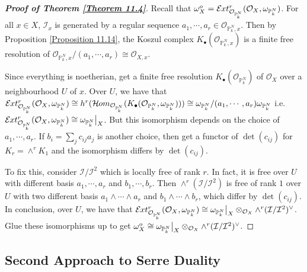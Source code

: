 \documentclass{ctexart}
\newcommand{\sheafhom}{\mathcal{H}\kern -.5pt om}
\newcommand{\sheafext}{\mathcal{E}\kern -.5pt xt}
\begin{document}
\begin{proof}[\textbf{\emph{Proof of Theorem \ref{Theorem 11.4}}}]
    Recall that $\omega_{X}^{o} = \sheafext_{\mathcal{O}_{\mathbb{P}_{k}^{N}}}^{r}(\mathcal{O}_{X}, \omega_{\mathbb{P}_{k}^{N}})$.
    For all $x\in X$, $\mathcal{I}_{x}$ is generated by a regular sequence $a_{1}, \cdots, a_{r}\in \mathcal{O}_{\mathbb{P}_{k}^{N}, x}$.
    Then by Proposition \ref{Proposition 11.14}, the Koszul complex $K_{\bullet}(\mathcal{O}_{\mathbb{P}_{k}^{N}, x})$ is a finite free resolution of $\mathcal{O}_{\mathbb{P}_{k}^{N}, x}/(a_{1}, \cdots, a_{r}) \cong \mathcal{O}_{X, x}$.
    \par
    Since everything is noetherian, get a finite free resolution $K_{\bullet}(\mathcal{O}_{\mathbb{P}_{k}^{N}})$ of $\mathcal{O}_{X}$ over a neighbourhood $U$ of $x$.
    Over $U$, we have that $\sheafext_{\mathcal{O}_{\mathbb{P}_{k}^{N}}}^{r}(\mathcal{O}_{X}, \omega_{\mathbb{P}_{k}^{N}}) \cong h^{r}(\sheafhom_{\mathcal{O}_{\mathbb{P}_{k}^{N}}}(K_{\bullet}(\mathcal{O}_{\mathbb{P}_{k}^{N}}, \omega_{\mathbb{P}_{k}^{N}}))) \cong \omega_{\mathbb{P}_{k}^{N}}/(a_{1}, \cdots, a_{r})\omega_{\mathbb{P}_{k}^{N}}$ i.e. $\sheafext_{\mathcal{O}_{\mathbb{P}_{k}^{N}}}^{r}(\mathcal{O}_{X}, \omega_{\mathbb{P}_{k}^{N}}) \cong \omega_{\mathbb{P}_{k}^{N}}\big{|}_{X}$.
    But this isomorphism depends on the choice of $a_{1}, \cdots, a_{r}$.
    If $b_{i} = \sum_{j} c_{ij}a_{j}$ is another choice, then get a functor of $\det(c_{ij})$ for $K_{r} = \wedge^{r} K_{1}$ and the isomorphism differs by $\det(c_{ij})$.
    \par
    To fix this, consider $\mathcal{I}/\mathcal{I}^{2}$ which is locally free of rank $r$.
    In fact, it is free over $U$ with different basis $a_{1}, \cdots,  a_{r}$ and $b_{1}, \cdots, b_{r}$.
    Then $\wedge^{r} (\mathcal{I/\mathcal{I}^{2}})$ is free of rank $1$ over $U$ with two different basis $a_{1} \wedge \cdots \wedge a_{r}$ and $b_{1} \wedge \cdots \wedge b_{r}$, which differ by $\det(c_{ij})$.
    In conclusion, over $U$, we have that $\sheafext_{\mathcal{O}_{\mathbb{P}_{k}^{N}}}^{r}(\mathcal{O}_{X}, \omega_{\mathbb{P}_{k}^{N}}) \cong \omega_{\mathbb{P}_{k}^{N}}\big{|}_{X} \otimes_{\mathcal{O}_{X}} \wedge^{r} (\mathcal{I}/\mathcal{I}^{2})^{\lor}$.
    Glue these isomorphisms up to get $\omega_{X}^{o} \cong \omega_{\mathbb{P}_{k}^{N}}\big{|}_{X} \otimes_{\mathcal{O}_{X}} \wedge^{r}(\mathcal{I}/\mathcal{I}^{2})^{\lor}$.
\end{proof}

\subsection{Second Approach to Serre Duality}
\label{subsection:Serre_Duality_Second_Approach_to_Serre_Duality}
\end{document}
